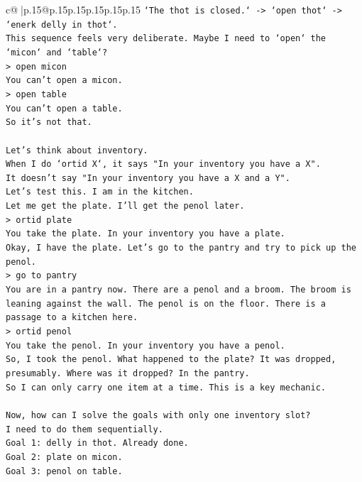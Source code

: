 \documentclass{article}
\begin{document}
{\begin{supertabular}{c@{$\;$}|p{.15\linewidth}@{}p{.15\linewidth}p{.15\linewidth}p{.15\linewidth}p{.15\linewidth}p{.15\linewidth}}
{{{\texttt{`The thot is closed.` {-}> `open thot` {-}> `enerk delly in thot`.} \\
\texttt{This sequence feels very deliberate. Maybe I need to `open` the `micon` and `table`?} \\
\texttt{> open micon} \\
\texttt{You can't open a micon.} \\
\texttt{> open table} \\
\texttt{You can't open a table.} \\
\texttt{So it's not that.} \\
\\ 
\texttt{Let's think about inventory.} \\
\texttt{When I do `ortid X`, it says "In your inventory you have a X".} \\
\texttt{It doesn't say "In your inventory you have a X and a Y".} \\
\texttt{Let's test this. I am in the kitchen.} \\
\texttt{Let me get the plate. I'll get the penol later.} \\
\texttt{> ortid plate} \\
\texttt{You take the plate. In your inventory you have a plate.} \\
\texttt{Okay, I have the plate. Let's go to the pantry and try to pick up the penol.} \\
\texttt{> go to pantry} \\
\texttt{You are in a pantry now. There are a penol and a broom. The broom is leaning against the wall. The penol is on the floor. There is a passage to a kitchen here.} \\
\texttt{> ortid penol} \\
\texttt{You take the penol. In your inventory you have a penol.} \\
\texttt{So, I took the penol. What happened to the plate? It was dropped, presumably. Where was it dropped? In the pantry.} \\
\texttt{So I can only carry one item at a time. This is a key mechanic.} \\
\\ 
\texttt{Now, how can I solve the goals with only one inventory slot?} \\
\texttt{I need to do them sequentially.} \\
\texttt{Goal 1: delly in thot. Already done.} \\
\texttt{Goal 2: plate on micon.} \\
\texttt{Goal 3: penol on table.} \\
}}}
\end{supertabular}}
\end{document}
